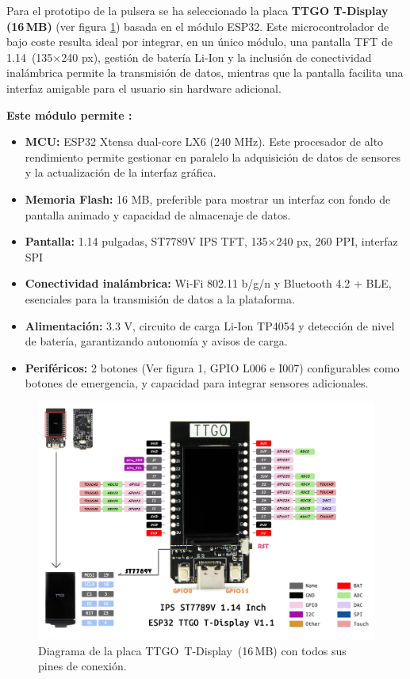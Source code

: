 \documentclass[12pt, a4paper]{article}
\begin{document}
	Para el prototipo de la pulsera se ha seleccionado la placa \textbf{TTGO T-Display (16\,MB)} (ver figura \ref{fig:ttgo_tdisplay_pines}) basada en el módulo ESP32. Este microcontrolador de bajo coste resulta ideal por integrar, en un único módulo, una pantalla TFT de 1.14\,\textquotedbl{} (135×240 px), gestión de batería Li-Ion y la inclusión de conectividad inalámbrica permite la transmisión de datos, mientras que la pantalla facilita una interfaz amigable para el usuario sin hardware adicional\cite{TTGO2021}.
	
	\noindent\textbf{Este módulo permite \cite{TTGO2021}:}
	\begin{itemize}
		\item \textbf{MCU:} ESP32 Xtensa dual-core LX6 (240 MHz). Este procesador de alto rendimiento permite gestionar en paralelo la adquisición de datos de sensores y la actualización de la interfaz gráfica.
		\item \textbf{Memoria Flash:} 16 MB, preferible para mostrar un interfaz con fondo de pantalla animado y capacidad de almacenaje de datos.
		\item \textbf{Pantalla:} 1.14 pulgadas, ST7789V IPS TFT, 135×240 px, 260 PPI, interfaz SPI
		\item \textbf{Conectividad inalámbrica:} Wi-Fi 802.11 b/g/n y Bluetooth 4.2 + BLE, esenciales para la transmisión de datos a la plataforma.
		\item \textbf{Alimentación:} 3.3 V, circuito de carga Li-Ion TP4054 y detección de nivel de batería, garantizando autonomía y avisos de carga.
		\item \textbf{Periféricos:} 2 botones (Ver figura 1, GPIO L006 e I007) configurables como botones de emergencia, y capacidad para integrar sensores adicionales.
	\end{itemize}
		
	\begin{figure}[htbp]
		\centering
		\includegraphics[width=1\textwidth]{images/TTGO_T-Display.jpg}
		\caption[Diagrama de pines de la TTGO T-Display]{Diagrama de la placa \mbox{TTGO T-Display (16\,MB)} con todos sus pines de conexión.}
		\label{fig:ttgo_tdisplay_pines}
	\end{figure}
	
\end{document}
